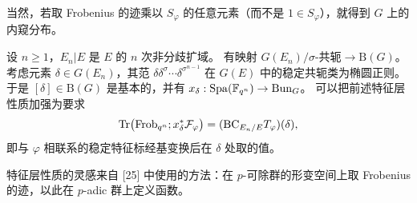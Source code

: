 \begin{remark}
当然，若取 Frobenius 的迹乘以 $S_\varphi$ 的任意元素（而不是 $1\in S_\varphi$），就得到 $G$ 上的内窥分布。
\end{remark}

\begin{remark}
设 $n\ge1$，$E_n|E$ 是 $E$ 的 $n$ 次非分歧扩域。
有映射 $G(E_n)/\sigma\text{-共轭}\to\mathrm{B}(G)$。
考虑元素 $\delta\in G(E_n)$，其范 $\delta\delta^\sigma\cdots\delta^{\sigma^{n-1}}$ 在 $G(E)$ 中的稳定共轭类为椭圆正则。
于是 $[\delta]\in\mathrm{B}(G)$ 是基本的，并有 $x_\delta:\mathrm{Spa}(\mathbb{F}_{q^n})\to\mathrm{Bun}_G$。
可以把前述特征层性质加强为要求
\[
\mathrm{Tr}\bigl(\mathrm{Frob}_{q^n};x_\delta^*\mathcal{F}_\varphi\bigr)
=(\mathrm{BC}_{E_n/E}T_\varphi)(\delta),
\]
即与 $\varphi$ 相联系的稳定特征标经基变换后在 $\delta$ 处取的值。
\end{remark}

\begin{remark}
特征层性质的灵感来自 [25] 中使用的方法：在 $p$-可除群的形变空间上取 Frobenius 的迹，以此在 $p$-adic 群上定义函数。
\end{remark}
